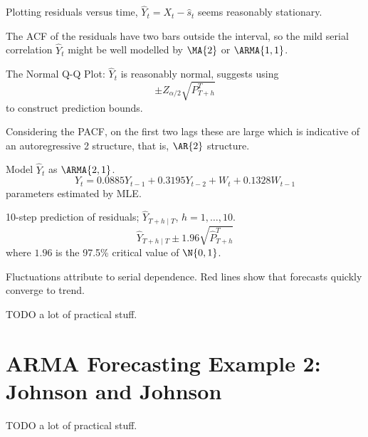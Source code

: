 Plotting residuals versus time, $ \hat{Y}_t=X_t-\hat{s}_t $ seems reasonably
stationary.

The ACF of the residuals have two bars outside the interval, so
the mild serial correlation $ \hat{Y}_t $ might be well modelled
by $ \MA{2} $ or $ \ARMA{1,1} $.

The Normal Q-Q Plot: $ \hat{Y}_t $ is reasonably normal, suggests
using
\[ \pm Z_{\alpha/2}\sqrt{P_{T+h}^T} \]
to construct prediction bounds.

Considering the PACF, on the first two lags these are large which
is indicative of an autoregressive 2 structure, that is, $ \AR{2} $
structure.

Model $ \hat{Y}_{t} $ as $ \ARMA{2,1} $.
\[ Y_t=0.0885 Y_{t-1}+0.3195 Y_{t-2}+W_t +0.1328 W_{t-1} \]
parameters estimated by MLE\@.

10-step prediction of residuals; $ \hat{Y}_{T+h\mid T} $, $ h=1,\ldots,10 $.
\[ \hat{Y}_{T+h\mid T}\pm 1.96\sqrt{\hat{P}_{T+h}^T} \]
where $ 1.96 $ is the 97.5\% critical value of $ \N{0,1} $.

Fluctuations attribute to serial dependence. Red lines
show that forecasts quickly converge to trend.

TODO a lot of practical stuff.

\section{ARMA Forecasting Example 2: Johnson and Johnson}
TODO a lot of practical stuff.
